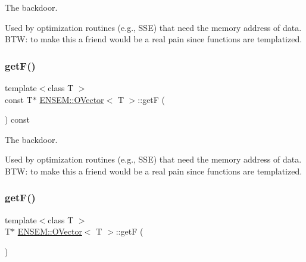 The backdoor. 

Used by optimization routines (e.\+g., S\+SE) that need the memory address of data. B\+TW\+: to make this a friend would be a real pain since functions are templatized. \mbox{\label{classENSEM_1_1OVector_ab4767b83741c029b996a49662c021f88}} 
\subsubsection{\texorpdfstring{getF()}{getF()}\hspace{0.1cm}{\footnotesize\ttfamily [2/4]}}
{\footnotesize\ttfamily template$<$class T $>$ \\
const T$\ast$ \mbox{\hyperlink{classENSEM_1_1OVector}{E\+N\+S\+E\+M\+::\+O\+Vector}}$<$ T $>$\+::getF (\begin{DoxyParamCaption}{ }\end{DoxyParamCaption}) const\hspace{0.3cm}{\ttfamily [inline]}}



The backdoor. 

Used by optimization routines (e.\+g., S\+SE) that need the memory address of data. B\+TW\+: to make this a friend would be a real pain since functions are templatized. \mbox{\label{classENSEM_1_1OVector_a73065fd6ed2149ce8699996d691c4c42}} 
\subsubsection{\texorpdfstring{getF()}{getF()}\hspace{0.1cm}{\footnotesize\ttfamily [3/4]}}
{\footnotesize\ttfamily template$<$class T $>$ \\
T$\ast$ \mbox{\hyperlink{classENSEM_1_1OVector}{E\+N\+S\+E\+M\+::\+O\+Vector}}$<$ T $>$\+::getF (\begin{DoxyParamCaption}{ }\end{DoxyParamCaption})\hspace{0.3cm}{\ttfamily [inline]}}

\mbox{\label{classENSEM_1_1OVector_a73065fd6ed2149ce8699996d691c4c42}} 

